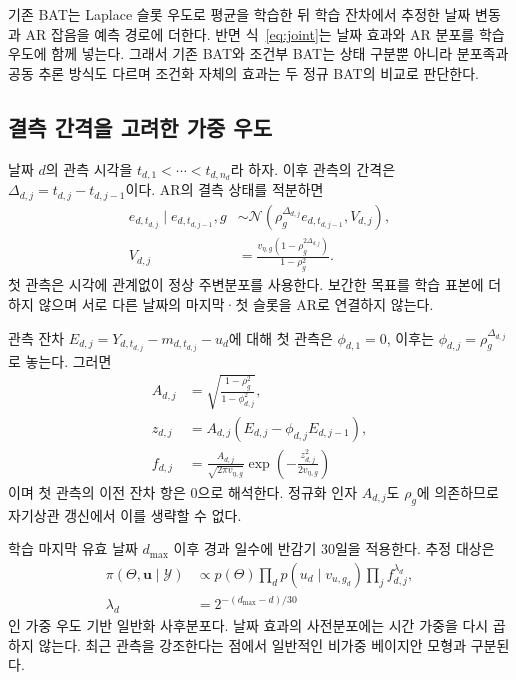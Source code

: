 \documentclass[letterpaper]{article}
\begin{document}
기존 BAT는 Laplace 슬롯 우도로 평균을 학습한 뒤 학습 잔차에서 추정한 날짜 변동과 AR 잡음을 예측 경로에 더한다. 반면 식~\eqref{eq:joint}는 날짜 효과와 AR 분포를 학습 우도에 함께 넣는다. 그래서 기존 BAT와 조건부 BAT는 상태 구분뿐 아니라 분포족과 공동 추론 방식도 다르며 조건화 자체의 효과는 두 정규 BAT의 비교로 판단한다.

\subsection{결측 간격을 고려한 가중 우도}
날짜 $d$의 관측 시각을 $t_{d,1}<\cdots<t_{d,n_d}$라 하자. 이후 관측의 간격은 $\Delta_{d,j}=t_{d,j}-t_{d,j-1}$이다. AR의 결측 상태를 적분하면
\begin{equation}
\begin{split}
 e_{d,t_{d,j}}\mid e_{d,t_{d,j-1}},g
 &\sim\mathcal N\!\left(\rho_g^{\Delta_{d,j}}e_{d,t_{d,j-1}},V_{d,j}\right),\\
 V_{d,j}&=\frac{v_{\eta,g}(1-\rho_g^{2\Delta_{d,j}})}{1-\rho_g^2}.
\end{split}
\label{eq:gap}
\end{equation}
첫 관측은 시각에 관계없이 정상 주변분포를 사용한다. 보간한 목표를 학습 표본에 더하지 않으며 서로 다른 날짜의 마지막·첫 슬롯을 AR로 연결하지 않는다.

관측 잔차 $E_{d,j}=Y_{d,t_{d,j}}-m_{d,t_{d,j}}-u_d$에 대해 첫 관측은 $\phi_{d,1}=0$, 이후는 $\phi_{d,j}=\rho_g^{\Delta_{d,j}}$로 놓는다. 그러면
\begin{equation}
\begin{split}
A_{d,j}&=\sqrt{\frac{1-\rho_g^2}{1-\phi_{d,j}^2}},\\
z_{d,j}&=A_{d,j}(E_{d,j}-\phi_{d,j}E_{d,j-1}),\\
f_{d,j}&=\frac{A_{d,j}}{\sqrt{2\pi v_{\eta,g}}}
                  \exp\!\left(-\frac{z_{d,j}^2}{2v_{\eta,g}}\right)
\end{split}
\label{eq:white}
\end{equation}
이며 첫 관측의 이전 잔차 항은 0으로 해석한다. 정규화 인자 $A_{d,j}$도 $\rho_g$에 의존하므로 자기상관 갱신에서 이를 생략할 수 없다.

학습 마지막 유효 날짜 $d_{\max}$ 이후 경과 일수에 반감기 30일을 적용한다. 추정 대상은
\begin{equation}
\begin{split}
\pi(\Theta,\boldsymbol u\mid\mathcal Y)
 &\propto p(\Theta)\prod_d p(u_d\mid v_{u,g_d})
                 \prod_j f_{d,j}^{\lambda_d},\\
\lambda_d&=2^{-(d_{\max}-d)/30}
\end{split}
\label{eq:posterior}
\end{equation}
인 가중 우도 기반 일반화 사후분포다. 날짜 효과의 사전분포에는 시간 가중을 다시 곱하지 않는다. 최근 관측을 강조한다는 점에서 일반적인 비가중 베이지안 모형과 구분된다.
\end{document}
